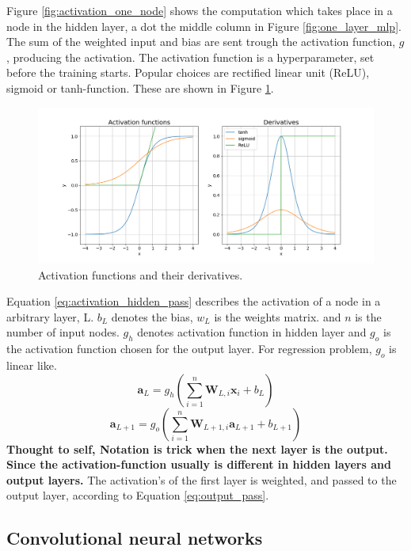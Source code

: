 \documentclass{article}
\begin{document}
Figure \ref{fig:activation_one_node} shows the computation which takes place in a node in the hidden layer, a dot the middle column in Figure \ref{fig:one_layer_mlp}. The sum of the weighted input and bias are sent trough the activation function, $g$, producing the activation. The activation function is a hyperparameter, set before the training starts. Popular choices are rectified linear unit (ReLU), sigmoid or tanh-function. These are shown in Figure \ref{fig:activation_function_example}.
\begin{figure}
    \centering
    \includegraphics[scale = 0.4]{activation_functions_and_derivatives.png}
    \caption{Activation functions and their derivatives.}
    \label{fig:activation_function_example}
\end{figure}
Equation \eqref{eq:activation_hidden_pass} describes the activation of a node in a arbitrary layer, L. $b_L$ denotes the bias, $w_L$ is the weights matrix. and $n$ is the number of input nodes. $g_h$ denotes activation function in hidden layer and $g_o$ is the activation function chosen for the output layer. For regression problem, $g_o$ is linear like.
\begin{equation} \label{eq:activation_hidden_pass}
    \textbf{a}_L = g_h(\sum_{i=1}^n \textbf{W}_{L, i} \textbf{x}_i + b_L)
\end{equation}
\begin{equation} \label{eq:output_pass}
    \textbf{a}_{L+1} = g_o(\sum_{i=1}^n \textbf{W}_{L+1, i} \textbf{a}_{L+1} + b_{L+1})
\end{equation}
\textbf{Thought to self, Notation is trick when the next layer is the output. Since the activation-function usually is different in hidden layers and output layers. }
The activation's of the first layer is weighted, and passed to the output layer, according to Equation \eqref{eq:output_pass}.

\subsection{Convolutional neural networks} \label{sec:convolutional neural network}
\end{document}
